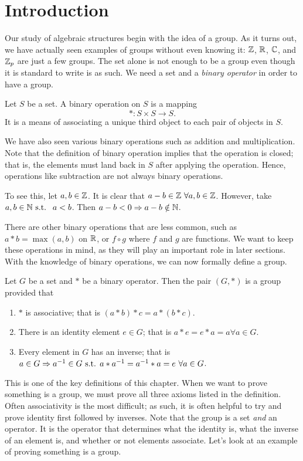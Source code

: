 \section{Introduction}
Our study of algebraic structures begin with the idea of a group. As it turns out, we have actually seen examples of groups without even knowing it: $\mathbb{Z}$, $\mathbb{R}$, $\mathbb{C}$, and $\mathbb{Z}_{p}$ are just a few groups. The set alone is not enough to be a group even though it is standard to write is as such. We need a set and a \textit{binary operator} in order to have a group.
\begin{definition}{}
	Let $S$ be a set. A binary operation on $S$ is a mapping
	\[*:S\times S \to S.\]
	It is a means of associating a unique third object to each pair of objects in $S$.
\end{definition}
We have also seen various binary operations such as addition and multiplication. Note that the definition of binary operation implies that the operation is closed; that is, the elements must land back in $S$ after applying the operation. Hence, operations like subtraction are not always binary operations.
\begin{example}{}
    To see this, let $a,b\in\mathbb{Z}$. It is clear that $a-b\in\mathbb{Z}\ \forall a,b\in\mathbb{Z}$. However, take $a,b\in\mathbb{N}\text{ s.t. }\ a<b$. Then $a-b<0\Rightarrow a-b\notin \mathbb{N}$.
\end{example}
There are other binary operations that are less common, such as $a*b=\max{(a,b)}$ on $\mathbb{R}$, or $f\circ g$ where $f$ and $g$ are functions. We want to keep these operations in mind, as they will play an important role in later sections. With the knowledge of binary operations, we can now formally define a group.

\begin{definition}{}
	Let $G$ be a set and $*$ be a binary operator. Then the pair $(G,*)$ is a group provided that
	\begin{enumerate}
		\item $*$ is associative; that is $(a*b)*c=a*(b*c)$.
		\item There is an identity element $e\in G$; that is $a*e=e*a=a \forall a\in G$.
		\item Every element in $G$ has an inverse; that is $a\in G\Rightarrow a^{-1}\in G \text{ s.t. } a*a^{-1}=a^{-1}*a=e\ \forall a\in G$.
	\end{enumerate}
\end{definition}
This is one of the key definitions of this chapter. When we want to prove something is a group, we must prove all three axioms listed in the definition. Often associativity is the most difficult; as such, it is often helpful to try and prove identity first followed by inverses. Note that the group is a set \textit{and} an operator. It is the operator that determines what the identity is, what the inverse of an element is, and whether or not elements associate.
Let's look at an example of proving something is a group.

